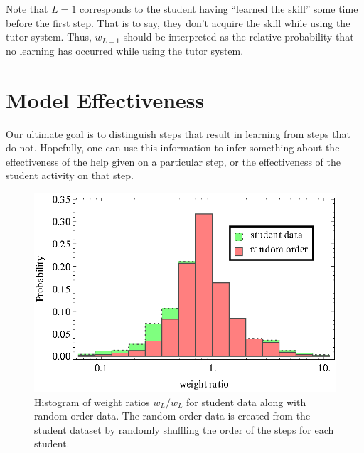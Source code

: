 \documentclass[11pt,letterpaper]{article}
\begin{document}
Note that $L=1$ corresponds to the student having ``learned the skill'' 
some time before the first step.  That is to say, they don't acquire 
the skill while using the tutor system.
Thus, $w_{L=1}$ should be interpreted as the relative probability
that no learning has occurred while using the tutor system.

\section{Model Effectiveness}

Our ultimate goal is to distinguish steps that result in 
learning from steps that do not.  Hopefully, one can use this
information to infer something about the effectiveness of the help
given on a particular step, or the effectiveness of
the student activity on that step.

\begin{figure}
  \centering \includegraphics{weight-ratio-histogram.eps}
   \caption{Histogram of weight ratios $w_L/\bar{w}_L$ for
     student data along with random order data.
     The random order data is created from the 
     student dataset by randomly shuffling the order
     of the steps for each student.}
    \label{weights-ratio-histogram}
\end{figure}
\end{document}
